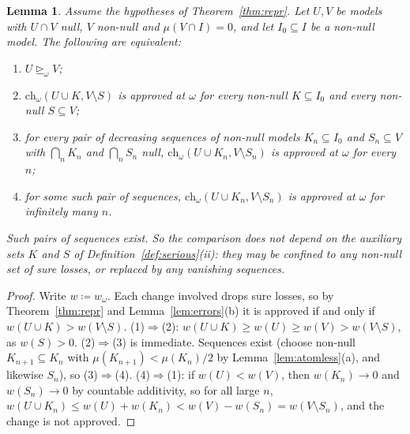 \documentclass[11pt]{article}
\newtheorem{lemma}[theorem]{Lemma}
\theoremstyle{definition}
\newcommand{\ch}{\mathrm{ch}}
\newcommand{\sge}{\trianglerighteq}
\begin{document}
\begin{lemma}\label{lem:auxiliary}
Assume the hypotheses of Theorem~\ref{thm:repr}. Let $U,V$ be models with $U\cap V$ null, $V$ non-null and $\mu(V\cap I)=0$, and let $I_0\subseteq I$ be a non-null model. The following are equivalent:
\begin{enumerate}[label=(\arabic*)]
\item $U\sge_\omega V$;
\item $\ch_\omega(U\cup K,V\setminus S)$ is approved at $\omega$ for every non-null $K\subseteq I_0$ and every non-null $S\subseteq V$;
\item for every pair of decreasing sequences of non-null models $K_n\subseteq I_0$ and $S_n\subseteq V$ with $\bigcap_nK_n$ and $\bigcap_nS_n$ null, $\ch_\omega(U\cup K_n,V\setminus S_n)$ is approved at $\omega$ for every $n$;
\item for some such pair of sequences, $\ch_\omega(U\cup K_n,V\setminus S_n)$ is approved at $\omega$ for infinitely many $n$.
\end{enumerate}
Such pairs of sequences exist. So the comparison does not depend on the auxiliary sets $K$ and $S$ of Definition~\ref{def:serious}(ii): they may be confined to any non-null set of sure losses, or replaced by any vanishing sequences.
\end{lemma}
\begin{proof}
Write $w\coloneqq w_\omega$. Each change involved drops sure losses, so by Theorem~\ref{thm:repr} and Lemma~\ref{lem:errors}(b) it is approved if and only if $w(U\cup K)>w(V\setminus S)$. (1)$\Rightarrow$(2): $w(U\cup K)\ge w(U)\ge w(V)>w(V\setminus S)$, as $w(S)>0$. (2)$\Rightarrow$(3) is immediate. Sequences exist (choose non-null $K_{n+1}\subseteq K_n$ with $\mu(K_{n+1})<\mu(K_n)/2$ by Lemma~\ref{lem:atomless}(a), and likewise $S_n$), so (3)$\Rightarrow$(4). (4)$\Rightarrow$(1): if $w(U)<w(V)$, then $w(K_n)\to0$ and $w(S_n)\to0$ by countable additivity, so for all large $n$, $w(U\cup K_n)\le w(U)+w(K_n)<w(V)-w(S_n)=w(V\setminus S_n)$, and the change is not approved.
\end{proof}
\end{document}
